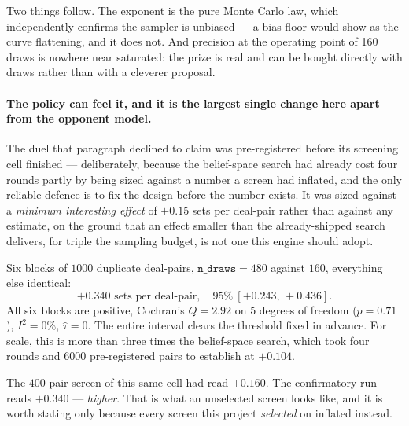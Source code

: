 \documentclass[11pt,a4paper]{article}
\begin{document}
Two things follow. The exponent is the pure Monte Carlo law, which independently
confirms the sampler is unbiased --- a bias floor would show as the curve
flattening, and it does not. And precision at the operating point of 160 draws is
nowhere near saturated: the prize is real and can be bought directly with draws
rather than with a cleverer proposal.

\paragraph{The policy can feel it, and it is the largest single change here apart from the opponent model.}
\label{sec:res-precision}
The duel that paragraph declined to claim was pre-registered before its
screening cell finished --- deliberately, because the belief-space search had
already cost four rounds partly by being sized against a number a screen had
inflated, and the only reliable defence is to fix the design before the number
exists. It was sized against a \emph{minimum interesting effect} of $+0.15$ sets
per deal-pair rather than against any estimate, on the ground that an effect
smaller than the already-shipped search delivers, for triple the sampling
budget, is not one this engine should adopt.

Six blocks of $1000$ duplicate deal-pairs, $\texttt{n\_draws} = 480$ against
$160$, everything else identical:
\[
  +0.340 \text{ sets per deal-pair}, \quad 95\%\ [+0.243,\, +0.436].
\]
All six blocks are positive, Cochran's $Q = 2.92$ on $5$ degrees of freedom
($p = 0.71$), $I^2 = 0\%$, $\hat\tau = 0$. The entire interval clears the
threshold fixed in advance. For scale, this is more than three times the
belief-space search, which took four rounds and $6000$ pre-registered pairs to
establish at $+0.104$.

The $400$-pair screen of this same cell had read $+0.160$. The confirmatory run
reads $+0.340$ --- \emph{higher}. That is what an unselected screen looks like,
and it is worth stating only because every screen this project \emph{selected}
on inflated instead.
\end{document}
